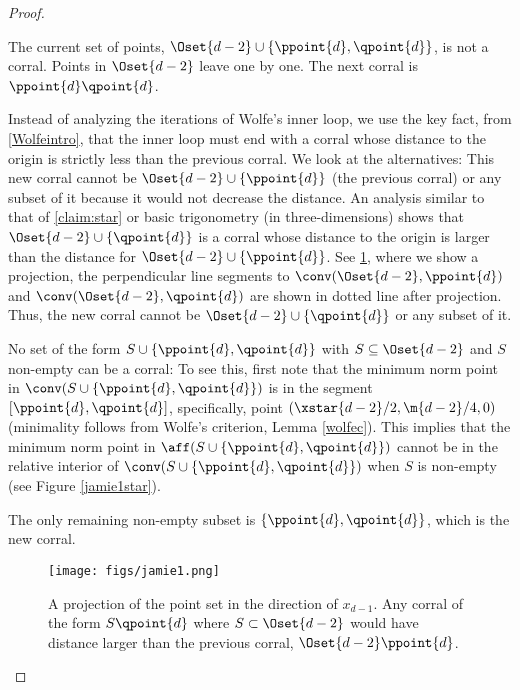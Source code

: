 \begin{proof}
\begin{claim}
The current set of points, $\Oset{d-2} \cup \{\ppoint{d}, \qpoint{d}\}$, is not a corral. 
Points in $\Oset{d-2}$ leave one by one. The next corral is $\ppoint{d} \qpoint{d}$. 
\end{claim}
\begin{claimproof}
Instead of analyzing the iterations of Wolfe's inner loop, we use the key fact,
from \cref{Wolfeintro}, that the inner loop must end with a corral whose distance to 
the origin is strictly less than the previous corral. We look at the alternatives:
This new corral cannot be $\Oset{d-2} \cup \{\ppoint{d}\}$ (the previous corral)  or any 
subset of it because it would not decrease the distance.
An analysis similar to that of \cref{claim:star} or basic trigonometry (in three-dimensions) 
shows that $\Oset{d-2} \cup \{\qpoint{d}\}$  is a corral whose distance to the origin 
is larger than the distance for 
$\Oset{d-2} \cup \{\ppoint{d}\}$. See \cref{jamie1}, where we show a projection, the perpendicular line segments to $\conv(\Oset{d-2},\ppoint{d})$ and $\conv(\Oset{d-2},\qpoint{d})$ are shown in dotted line after projection.  
Thus, the new corral cannot be $\Oset{d-2} \cup \{\qpoint{d}\}$ or any subset of it.

No set of the form $S \cup \{\ppoint{d}, \qpoint{d}\}$ with $S \subseteq \Oset{d-2}$ and 
$S$ non-empty can be a corral: 
To see this, first note that the minimum norm point in $\conv(S \cup \{\ppoint{d}, \qpoint{d}\})$ 
is in the segment $[\ppoint{d}, \qpoint{d}]$, specifically, point $(\xstar{d-2}/2, \m{d-2}/4,0)$ 
(minimality follows from Wolfe's criterion, Lemma \ref{wolfec}).
This implies that the minimum norm point in $\aff (S \cup \{\ppoint{d}, \qpoint{d}\})$ cannot be in the relative interior of $\conv(S \cup \{\ppoint{d}, \qpoint{d}\})$ when $S$ is non-empty (see Figure \ref{jamie1star}).

The only remaining non-empty subset is $\{\ppoint{d}, \qpoint{d}\}$, which is the new corral.
\end{claimproof}

\begin{figure}
\begin{center}
\texttt{[image: figs/jamie1.png]}
\end{center}
\caption{A projection of the point set in the direction of $x_{d-1}$. Any corral of the form $S\qpoint{d}$ where $S \subset \Oset{d-2}$ would have distance larger than the previous corral, $\Oset{d-2}\ppoint{d}$.}\label{jamie1}
\end{figure}


\end{proof}
